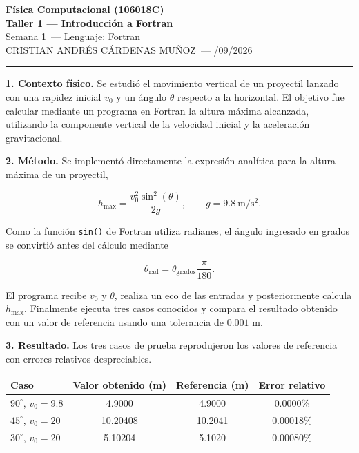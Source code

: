 \documentclass[11pt]{article}
\newcommand{\curso}{Física Computacional (106018C)}
\newcommand{\taller}{Taller 1 --- Introducción a Fortran}
\newcommand{\semana}{Semana 1}
\newcommand{\lenguaje}{Fortran}
\newcommand{\estudiante}{CRISTIAN ANDRÉS CÁRDENAS MUÑOZ}
\newcommand{\fechaentrega}{14/09/2026}
\begin{document}
\begin{center}
  {\large\bfseries \curso} \\[2pt]
  {\bfseries \taller} \\[2pt]
  \semana\ \quad --- \quad Lenguaje: \lenguaje \\[2pt]
  \estudiante\ \quad --- \quad \fechaentrega
\end{center}

\vspace{4pt}
\hrule
\vspace{6pt}


\textbf{1. Contexto físico.}
Se estudió el movimiento vertical de un proyectil lanzado con una rapidez inicial $v_0$ y un ángulo $\theta$ respecto a la horizontal. El objetivo fue calcular mediante un programa en Fortran la altura máxima alcanzada, utilizando la componente vertical de la velocidad inicial y la aceleración gravitacional.


\textbf{2. Método.}
Se implementó directamente la expresión analítica para la altura máxima de un proyectil,

\begin{equation*}
h_{\max} =
\frac{v_0^2\sin^2(\theta)}{2g},
\qquad
g = 9.8\ \mathrm{m/s^2}.
\end{equation*}

Como la función \texttt{sin()} de Fortran utiliza radianes, el ángulo ingresado en grados se convirtió antes del cálculo mediante

\begin{equation*}
\theta_{\mathrm{rad}}
=
\theta_{\mathrm{grados}}
\frac{\pi}{180}.
\end{equation*}

El programa recibe $v_0$ y $\theta$, realiza un eco de las entradas y posteriormente calcula $h_{\max}$. Finalmente ejecuta tres casos conocidos y compara el resultado obtenido con un valor de referencia usando una tolerancia de $0.001$ m.


\textbf{3. Resultado.}
Los tres casos de prueba reprodujeron los valores de referencia con errores relativos despreciables.

\begin{center}
\begin{tabular}{lccc}
\toprule
Caso & Valor obtenido (m) & Referencia (m) & Error relativo \\
\midrule
$90^\circ$, $v_0=9.8$ & 4.9000 & 4.9000 & 0.0000\% \\
$45^\circ$, $v_0=20$ & 10.20408 & 10.2041 & 0.00018\% \\
$30^\circ$, $v_0=20$ & 5.10204 & 5.1020 & 0.00080\% \\
\bottomrule
\end{tabular}
\end{center}
\end{document}
